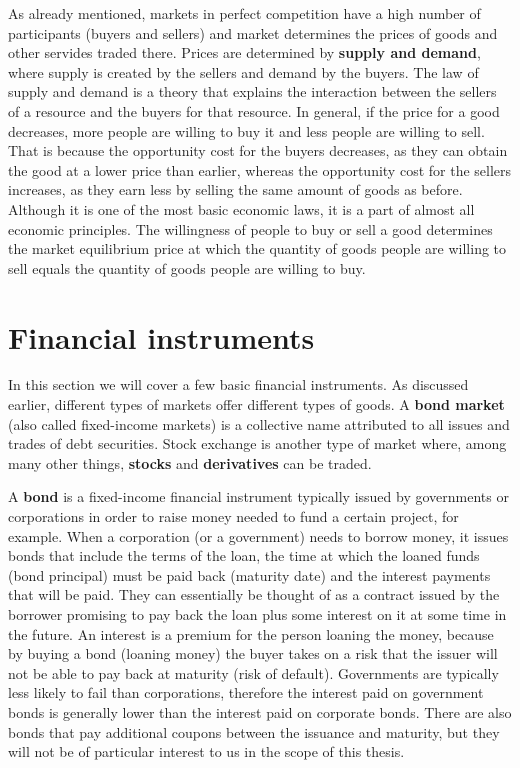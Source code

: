 \documentclass[times, utf8, diplomski]{fer}
\begin{document}
As already mentioned, markets in perfect competition have a high number of participants (buyers and sellers) and market determines the prices of goods and other servides traded there. Prices are determined by \textbf{supply and demand}, where supply is created by the sellers and demand by the buyers. The law of supply and demand is a theory that explains the interaction between the sellers of a resource and the buyers for that resource. In general, if the price for a good decreases, more people are willing to buy it and less people are willing to sell. That is because the opportunity cost for the buyers decreases, as they can obtain the good at a lower price than earlier, whereas the opportunity cost for the sellers increases, as they earn less by selling the same amount of goods as before. Although it is one of the most basic economic laws, it is a part of almost all economic principles. The willingness of people to buy or sell a good determines the market equilibrium price at which the quantity of goods people are willing to sell equals the quantity of goods people are willing to buy. 

\section{Financial instruments}
In this section we will cover a few basic financial instruments. As discussed earlier, different types of markets offer different types of goods. A \textbf{bond market} (also called fixed-income markets) is a collective name attributed to all issues and trades of debt securities. Stock exchange is another type of market where, among many other things, \textbf{stocks} and \textbf{derivatives} can be traded. 

\hfill \break
\indent A \textbf{bond} is a fixed-income financial instrument typically issued by governments or corporations in order to raise money needed to fund a certain project, for example. When a corporation (or a government) needs to borrow money, it issues bonds that include the terms of the loan, the time at which the loaned funds (bond principal) must be paid back (maturity date) and the interest payments that will be paid. They can essentially be thought of as a contract issued by the borrower promising to pay back the loan plus some interest on it at some time in the future. An interest is a premium for the person loaning the money, because by buying a bond (loaning money) the buyer takes on a risk that the issuer will not be able to pay back at maturity (risk of default). Governments are typically less likely to fail than corporations, therefore the interest paid on government bonds is generally lower than the interest paid on corporate bonds. There are also bonds that pay additional coupons between the issuance and maturity, but they will not be of particular interest to us in the scope of this thesis.
\end{document}
